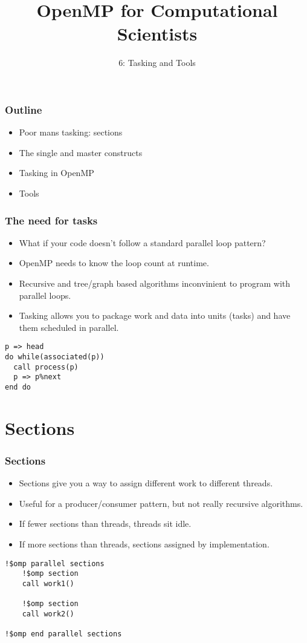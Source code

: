 \documentclass{beamer}
\title{OpenMP for Computational Scientists}
\subtitle{6: Tasking and Tools}
\begin{document}
\frame{\titlepage}

\begin{frame}
\frametitle{Outline}
\begin{itemize}
  \item Poor mans tasking: sections
  \item The single and master constructs
  \item Tasking in OpenMP
  \item Tools
\end{itemize}
\end{frame}

\begin{frame}[fragile]
\frametitle{The need for tasks}
\begin{itemize}
  \item What if your code doesn't follow a standard parallel loop pattern?
  \item OpenMP needs to know the loop count at runtime.
  \item Recursive and tree/graph based algorithms inconvinient to program with parallel loops.
  \item Tasking allows you to package work and data into units (tasks) and have them scheduled in parallel.
\end{itemize}

\begin{verbatim}
p => head
do while(associated(p))
  call process(p)
  p => p%next
end do
\end{verbatim}
\end{frame}
\section{Sections}
\begin{frame}[fragile]
\frametitle{Sections}
\begin{itemize}
  \item Sections give you a way to assign different work to different threads.
  \item Useful for a producer/consumer pattern, but not really recursive algorithms.
  \item If fewer sections than threads, threads sit idle.
  \item If more sections than threads, sections assigned by implementation.
\end{itemize}

\begin{verbatim}
!$omp parallel sections
    !$omp section
    call work1()

    !$omp section
    call work2()

!$omp end parallel sections
\end{verbatim}
\end{frame}
\end{document}
